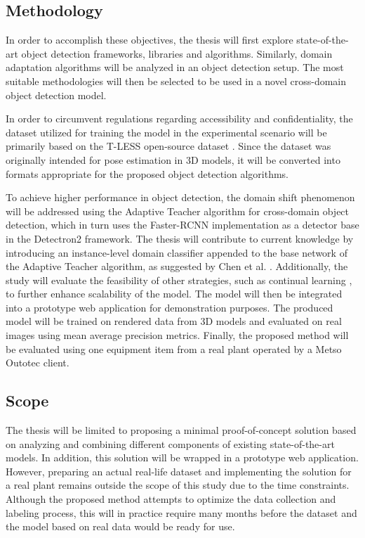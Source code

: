 \subsection{Methodology}
In order to accomplish these objectives, the thesis will first explore state-of-the-art object detection frameworks, libraries and algorithms. Similarly, domain adaptation algorithms will be analyzed in an object detection setup. The most suitable methodologies will then be selected to be used in a novel cross-domain object detection model.  

In order to circumvent regulations regarding accessibility and confidentiality, the dataset utilized for training the model in the experimental scenario will be primarily based on the T-LESS open-source dataset \cite{hodan2017tless}. Since the dataset was originally intended for pose estimation in 3D models, it will be converted into formats appropriate for the proposed object detection algorithms.

To achieve higher performance in object detection, the domain shift phenomenon will be addressed using the Adaptive Teacher \cite{Li2021} algorithm for cross-domain object detection, which in turn uses the Faster-RCNN \cite{ima} implementation as a detector base in the Detectron2 \cite{wu2019Detectron2} framework.  The thesis will contribute to current knowledge by introducing an instance-level domain classifier appended to the base network of the Adaptive Teacher algorithm, as suggested by Chen et al. \cite{Chen2018}. Additionally, the study will evaluate the feasibility of other strategies, such as continual learning \cite{Parisi2018}, to further enhance scalability of the model. The model will then be integrated into a prototype web application for demonstration purposes. The produced model will be trained on rendered data from 3D models and evaluated on real images using mean average precision metrics. Finally, the proposed method will be evaluated using one equipment item from a real plant operated by a Metso Outotec client.

\clearpage

\subsection{Scope}

The thesis will be limited to proposing a minimal proof-of-concept solution based on analyzing and combining different components of existing state-of-the-art models. In addition, this solution will be wrapped in a prototype web application. However, preparing an actual real-life dataset and implementing the solution for a real plant remains outside the scope of this study due to the time constraints. Although the proposed method attempts to optimize the data collection and labeling process, this will in practice require many months before the dataset and the model based on real data would be ready for use. 

